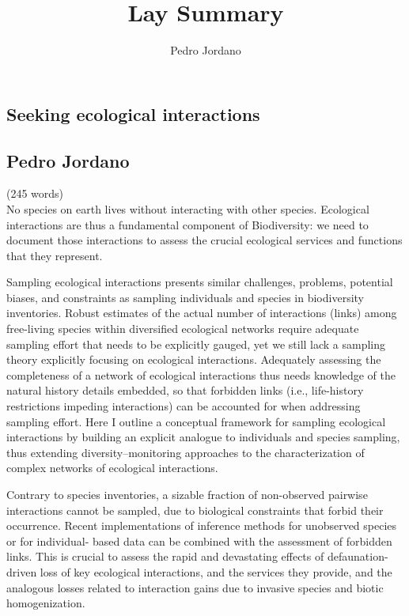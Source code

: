 \documentclass[a4paper,12pt]{article}
\begin{document}
\title{Lay Summary}

\author{Pedro Jordano}

\maketitle
\newpage
\begin{spacing}{1.5}
\section*{Seeking ecological interactions}
\subsection*{Pedro Jordano}
(245 words)\\

No species on earth lives without interacting with other species. Ecological interactions are thus a fundamental component of Biodiversity: we need to document those interactions to assess the crucial ecological services and functions that they represent.

Sampling ecological interactions presents similar challenges, problems, potential biases, and constraints as sampling individuals and species in biodiversity inventories. Robust estimates of the actual number of interactions (links) among free-living species within diversified ecological networks require adequate sampling effort that needs to be explicitly gauged, yet we still lack a sampling theory explicitly focusing on ecological interactions. Adequately assessing the completeness of a network of ecological interactions thus needs knowledge of the natural history details embedded, so that forbidden links (i.e., life-history restrictions impeding interactions) can be accounted for when addressing sampling effort. Here I outline a conceptual framework for sampling ecological interactions by building an explicit analogue to individuals and species sampling, thus extending diversity--monitoring approaches to the characterization of complex networks of ecological interactions. 

Contrary to species inventories, a sizable fraction of non-observed pairwise interactions cannot be sampled, due to biological constraints that forbid their occurrence. Recent implementations of inference methods for unobserved species or for individual- based data can be combined with the assessment of forbidden links. This is crucial to assess the rapid and devastating effects of defaunation-driven loss of key ecological interactions, and the services they provide, and the analogous losses related to interaction gains due to invasive species and biotic homogenization.

\end{spacing}
\end{document}
